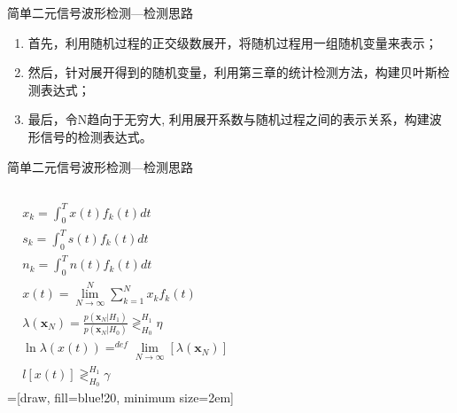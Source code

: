 \begin{frame}{简单二元信号波形检测---检测思路}
\begin{enumerate}
	\setlength{\itemsep}{.5cm}
	\item 首先，利用随机过程的正交级数展开，将随机过程用一组随机变量来表示；
	\item 然后，针对展开得到的随机变量，利用第三章的统计检测方法，构建贝叶斯检测表达式；
	\item 最后，令N趋向于无穷大, 利用展开系数与随机过程之间的表示关系，构建波形信号的检测表达式。
\end{enumerate}
\end{frame}

\begin{frame}{简单二元信号波形检测---检测思路}
\begin{columns}
\begin{align*}
&x_k=\int_{0}^{T}x(t)f_k(t)dt\\
&s_k=\int_{0}^{T}s(t)f_k(t)dt\\
&n_k=\int_{0}^{T}n(t)f_k(t)dt\\
&x(t)=\lim\limits_{N\to\infty}^N\sum\limits_{k=1}^Nx_kf_k(t)\\
&\lambda(\bm{x}_N)=\frac{p(\bm{x}_N|H_1)}{p(\bm{x}_N|H_0)}\mathop{\gtrless}_{H_0}^{H_1}\eta\\
&\ln\lambda(x(t))\mathop{=}^{def}\lim\limits_{N\to\infty}[\lambda(\bm{x}_N)]\\
&l[x(t)]\mathop{\gtrless}_{H_0}^{H_1}\gamma
\end{align*}
\centering
{}=[draw, fill=blue!20, minimum size=2em]
\end{columns}
\end{frame}

